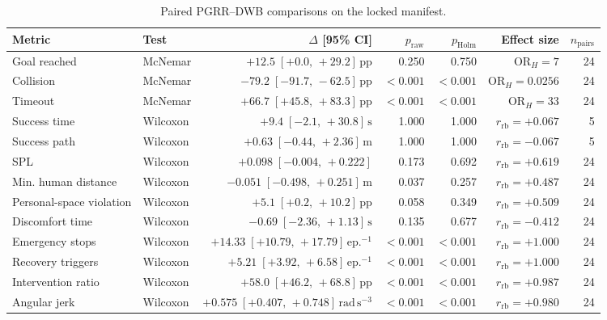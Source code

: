 \begin{table}[t]
\caption{Paired PGRR--DWB comparisons on the locked manifest.}
\label{tab:statistical-results}
\centering
\footnotesize
\setlength{\tabcolsep}{4.0pt}
\renewcommand{\arraystretch}{1.08}
\begin{tabular}{@{}llrrrrr@{}}
\toprule
Metric & Test & $\Delta$ [95\% CI] & $p_{\mathrm{raw}}$ & $p_{\mathrm{Holm}}$
& Effect size & $n_{\mathrm{pairs}}$ \\
\midrule
Goal reached & McNemar & $+12.5\;[+0.0,\,+29.2]\,\mathrm{pp}$ & 0.250 & 0.750 & $\mathrm{OR}_H=7$ & 24 \\
Collision & McNemar & $-79.2\;[-91.7,\,-62.5]\,\mathrm{pp}$ & $<0.001$ & $<0.001$ & $\mathrm{OR}_H=0.0256$ & 24 \\
Timeout & McNemar & $+66.7\;[+45.8,\,+83.3]\,\mathrm{pp}$ & $<0.001$ & $<0.001$ & $\mathrm{OR}_H=33$ & 24 \\
\addlinespace[2pt]
Success time & Wilcoxon & $+9.4\;[-2.1,\,+30.8]\,\mathrm{s}$ & 1.000 & 1.000 & $r_{\mathrm{rb}}=+0.067$ & 5 \\
Success path & Wilcoxon & $+0.63\;[-0.44,\,+2.36]\,\mathrm{m}$ & 1.000 & 1.000 & $r_{\mathrm{rb}}=-0.067$ & 5 \\
SPL & Wilcoxon & $+0.098\;[-0.004,\,+0.222]$ & 0.173 & 0.692 & $r_{\mathrm{rb}}=+0.619$ & 24 \\
Min. human distance & Wilcoxon & $-0.051\;[-0.498,\,+0.251]\,\mathrm{m}$ & 0.037 & 0.257 & $r_{\mathrm{rb}}=+0.487$ & 24 \\
Personal-space violation & Wilcoxon & $+5.1\;[+0.2,\,+10.2]\,\mathrm{pp}$ & 0.058 & 0.349 & $r_{\mathrm{rb}}=+0.509$ & 24 \\
Discomfort time & Wilcoxon & $-0.69\;[-2.36,\,+1.13]\,\mathrm{s}$ & 0.135 & 0.677 & $r_{\mathrm{rb}}=-0.412$ & 24 \\
Emergency stops & Wilcoxon & $+14.33\;[+10.79,\,+17.79]\,\mathrm{ep.}^{-1}$ & $<0.001$ & $<0.001$ & $r_{\mathrm{rb}}=+1.000$ & 24 \\
Recovery triggers & Wilcoxon & $+5.21\;[+3.92,\,+6.58]\,\mathrm{ep.}^{-1}$ & $<0.001$ & $<0.001$ & $r_{\mathrm{rb}}=+1.000$ & 24 \\
Intervention ratio & Wilcoxon & $+58.0\;[+46.2,\,+68.8]\,\mathrm{pp}$ & $<0.001$ & $<0.001$ & $r_{\mathrm{rb}}=+0.987$ & 24 \\
Angular jerk & Wilcoxon & $+0.575\;[+0.407,\,+0.748]\,\mathrm{rad}\,\mathrm{s}^{-3}$ & $<0.001$ & $<0.001$ & $r_{\mathrm{rb}}=+0.980$ & 24 \\
\bottomrule
\end{tabular}
\vspace{2pt}


\end{table}
